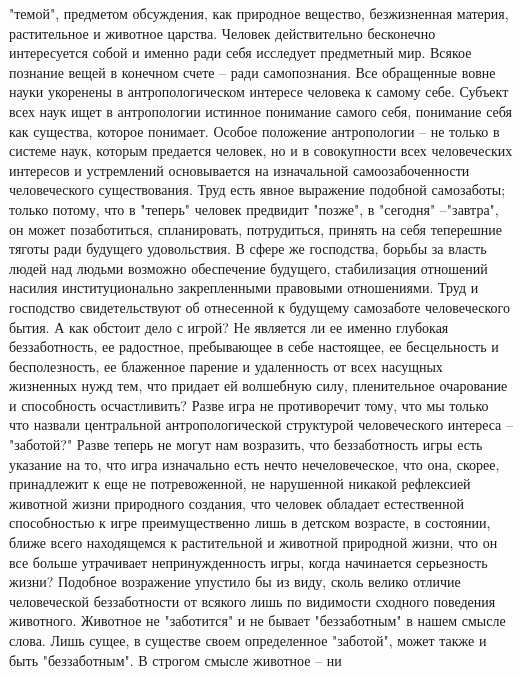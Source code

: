 \documentclass[12pt]{article}
\begin{document}
"темой", предметом обсуждения, как природное вещество, безжизненная материя, растительное и животное  
царства. Человек действительно бесконечно интересуется собой и именно ради себя исследует предметный мир.
Всякое познание вещей в конечном счете -- ради самопознания. Все обращенные вовне науки укоренены в
антропологическом  интересе  человека  к  самому  себе.  Субъект  всех  наук  ищет  в  антропологии  истинное
понимание самого себя, понимание себя как существа, которое понимает. Особое положение антропологии -- не
только  в  системе  наук,  которым  предается  человек,  но  и  в  совокупности  всех  человеческих  интересов  и
устремлений основывается на изначальной самоозабоченности человеческого существования. Труд есть явное
выражение подобной самозаботы; только потому, что в "теперь" человек предвидит "позже", в "сегодня" --"завтра", он может позаботиться, спланировать, потрудиться, принять на себя теперешние тяготы ради будущего
удовольствия. В сфере же господства, борьбы за власть людей над людьми возможно обеспечение будущего,
стабилизация  отношений  насилия  институционально  закрепленными  правовыми  отношениями.  Труд  и
господство свидетельствуют об отнесенной к будущему самозаботе человеческого бытия.
А как обстоит дело с игрой? Не является ли ее именно глубокая беззаботность, ее радостное, пребывающее в
себе настоящее, ее бесцельность и бесполезность, ее блаженное парение и удаленность от всех насущных
жизненных нужд тем, что придает ей волшебную силу, пленительное очарование и способность осчастливить?
Разве  игра  не  противоречит  тому,  что  мы  только  что  назвали  центральной  антропологической  структурой
человеческого  интереса  --  "заботой?"  Разве  теперь  не  могут  нам  возразить,  что  беззаботность  игры  есть
указание  на  то,  что  игра  изначально  есть  нечто  нечеловеческое,  что  она,  скорее,  принадлежит  к  еще  не
потревоженной,  не  нарушенной  никакой  рефлексией  животной  жизни  природного  создания,  что  человек
обладает естественной способностью к игре преимущественно лишь в детском возрасте, в состоянии, ближе
всего  находящемся  к  растительной  и  животной  природной  жизни,  что  он  все  больше  утрачивает
непринужденность игры, когда начинается серьезность жизни? Подобное возражение упустило бы из виду,
сколь  велико  отличие  человеческой  беззаботности  от  всякого  лишь  по  видимости  сходного  поведения
животного.  Животное  не  "заботится"  и  не  бывает  "беззаботным"  в  нашем  смысле  слова.  Лишь  сущее,  в
существе своем определенное "заботой", может также и быть "беззаботным". В строгом смысле животное -- ни
\end{document}
